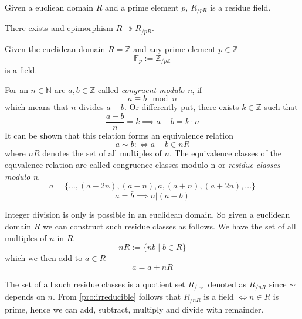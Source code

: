\begin{definition}
   Given a eucliean domain \(R\) and a prime element \(p\), \(R_{/pR}\) is a residue field.
\end{definition}
\begin{remark}
   There exists and epimorphism \(R \twoheadrightarrow R_{/pR}\).
\end{remark}

\begin{definition}
   Given the euclidean domain \(R = \mathbb{Z}\) and any prime element \(p \in \mathbb{Z}\)
   \[\mathbb{F}_p := \mathbb{Z}_{/p\mathbb{Z}}\]
   is a field.
\end{definition}

For an \(n \in \mathbb{N}\) are \(a, b \in \mathbb{Z}\) called \textit{congruent modulo n}, if
\[a \equiv b \mod n\]
which means that \(n\) divides \(a - b\).
Or differently put, there exists \(k \in \mathbb{Z}\) such that
\[\frac{a - b}{n} = k \implies a - b = k \cdot n\]
It can be shown that this relation forms an equivalence relation
\[a \sim b :\iff a - b \in nR\]
where \(nR\) denotes the set of all multiples of \(n\).
The equivalence classes of the equvalence relation are called congruence classes modulo n or \textit{residue classes modulo n}.
\[\bar{a} = \{\ldots, (a-2n), (a-n), a, (a+n), (a+2n), \ldots\}\]
\[\bar{a} = \bar{b} \implies n | (a - b)\]

Integer division is only is possible in an euclidean domain.
So given a euclidean domain \(R\) we can construct such residue classes as follows.
We have the set of all multiples of \(n\) in \(R\).
\[nR := \{nb \mid b \in R\}\]
which we then add to \(a \in R\)
\[\bar{a} = a + nR\]

The set of all such residue classes is a quotient set \(R_{/\sim}\) denoted as \(R_{/nR}\) since \(\sim\) depends on \(n\).
From \cref{pro:irreducible} follows that \(R_{/nR}\) is a field \(\iff n \in R\) is prime, hence we can add, subtract, multiply and divide with remainder.

